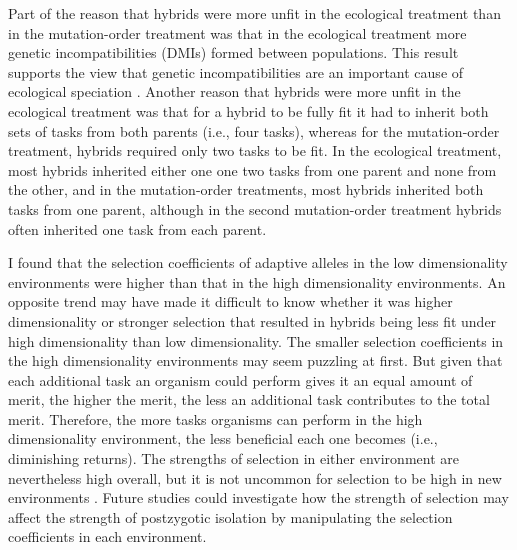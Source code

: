 \begin{doublespace}
Part of the reason that hybrids were more unfit in the ecological treatment
than in the mutation-order treatment was that in the ecological treatment
more genetic incompatibilities (DMIs) formed between populations.
%
This result supports the view that genetic incompatibilities
are an important cause of ecological speciation \citep{run05}.
%
Another reason that hybrids were more unfit in the ecological treatment was
that for a hybrid to be fully fit it had to inherit both sets of tasks from
both parents (i.e., four tasks), whereas for the mutation-order treatment,
hybrids required only two tasks to be fit.
%
In the ecological treatment, most hybrids inherited either one one two tasks
from one parent and none from the other, and in the mutation-order treatments,
most hybrids inherited both tasks from one parent, although in the second
mutation-order treatment hybrids often inherited one task from each parent.



I found that the selection coefficients of adaptive alleles
in the low dimensionality environments were higher
than that in the high dimensionality environments.
%
An opposite trend may have made it difficult to know whether
it was higher dimensionality or stronger selection that resulted
in hybrids being less fit under high dimensionality than low dimensionality.
%
The smaller selection coefficients in the high dimensionality environments
may seem puzzling at first.
%
But given that each additional task an organism could perform gives it
an equal amount of merit, the higher the merit, the less an additional task
contributes to the total merit.
%
Therefore, the more tasks organisms can perform in the high dimensionality
environment, the less beneficial each one becomes (i.e., diminishing returns).
%
The strengths of selection in either environment are nevertheless high overall,
but it is not uncommon for selection to be high in new environments
\citep[e.g.,][]{len91,det07}.
%
Future studies could investigate how the strength of selection may affect
the strength of postzygotic isolation
by manipulating the selection coefficients in each environment.




\end{doublespace}
